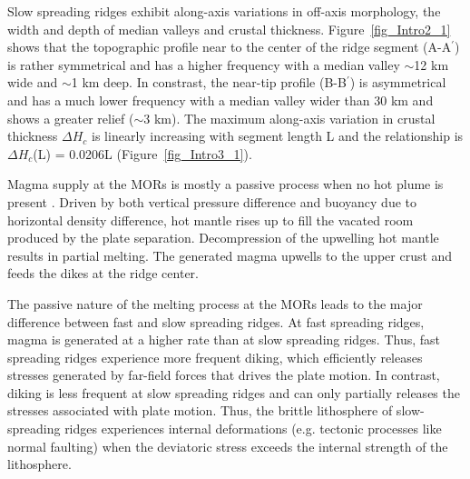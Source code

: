 Slow spreading ridges exhibit along-axis variations in off-axis morphology, the width and depth of median valleys and crustal thickness.  Figure~\ref{fig_Intro2_1} shows that the topographic profile near to the center of the ridge segment (A-A$^{\prime}$) is rather symmetrical and has a higher frequency with a median valley $\sim$12 km wide and $\sim$1 km deep. In constrast, the near-tip profile (B-B$^{\prime}$) is asymmetrical and has a much lower frequency with a median valley wider than 30 km and shows a greater relief ($\sim$3 km). The maximum along-axis variation in crustal thickness $\Delta H_{c}$ is linearly increasing with segment length L \citep{Chen1999} and the relationship is $\Delta H_{c}$(L) = 0.0206L (Figure~\ref{fig_Intro3_1}).


%

Magma supply at the MORs is mostly a passive process when no hot plume is present \citep{Fowler2004}. Driven by both vertical pressure difference and buoyancy due to horizontal density difference, hot mantle rises up to fill the vacated room produced by the plate separation. Decompression of the upwelling hot mantle results in partial melting. The generated magma upwells to the upper crust and feeds the dikes at the ridge center. %

The passive nature of the melting process at the MORs leads to the major difference between fast and slow spreading ridges. At fast spreading ridges, magma is generated at a higher rate than at slow spreading ridges. Thus, fast spreading ridges experience more frequent diking, which efficiently releases stresses generated by far-field forces that drives the plate motion. In contrast, diking is less frequent at slow spreading ridges and can only partially releases the stresses associated with plate motion. Thus, the brittle lithosphere of slow-spreading ridges experiences internal deformations (e.g. tectonic processes like normal faulting) when the deviatoric stress exceeds the internal strength of the lithosphere.

